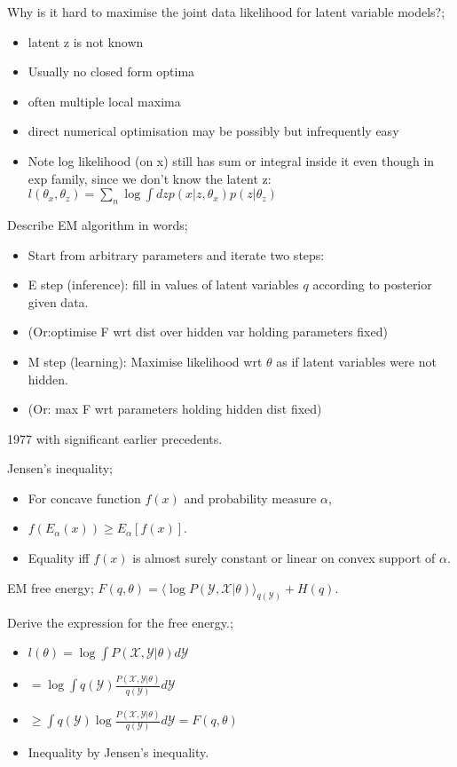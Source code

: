 \documentclass{article}
\begin{document}
Why is it hard to maximise the joint data likelihood for latent variable models?; \begin{itemize} \item latent z is not known \item Usually no closed form optima \item often multiple local maxima \item direct numerical optimisation may be possibly but infrequently easy \item Note log likelihood (on x) still has sum or integral inside it even though in exp family, since we don't know the latent z: $l(\theta_x, \theta_z) = \sum_n \log\int dz p(x|z,\theta_x)p(z|\theta_z)$  \end{itemize}

Describe EM algorithm in words; \begin{itemize} \item Start from arbitrary parameters and iterate two steps: \item E step (inference): fill in values of latent variables $q$ according to posterior given data.  \item (Or:optimise F wrt dist over hidden var holding parameters fixed) \item M step (learning): Maximise likelihood wrt $\theta$ as if latent variables were not hidden.  \item (Or: max F wrt parameters holding hidden dist fixed) \end{itemize} 1977 with significant earlier precedents.

Jensen's inequality; \begin{itemize} \item For concave function $f(x)$ and probability measure $\alpha$, \item $f(E_{\alpha}(x))\geq E_\alpha[f(x)]$.  \item Equality iff $f(x)$ is almost surely constant or linear on convex support of $\alpha$.  \end{itemize}

EM free energy; $F(q,\theta) = \langle \log P(\mathcal{Y, X}|\theta)\rangle_{q(\mathcal{Y})}+H(q)$.

Derive the expression for the free energy.; \begin{itemize} \item $l(\theta) = \log \int P(\mathcal{X, Y}|\theta)d\mathcal{Y}$ \item $= \log \int q(\mathcal{Y})\frac{P(\mathcal{X, Y}|\theta)}{q(\mathcal{Y})}d\mathcal{Y}$ \item $\geq \int q(\mathcal{Y})\log \frac{P(\mathcal{X, Y}|\theta)}{q(\mathcal{Y})}d\mathcal{Y} = F(q,\theta)$ \item Inequality by Jensen's inequality.  \end{itemize} 
            
\end{document}
